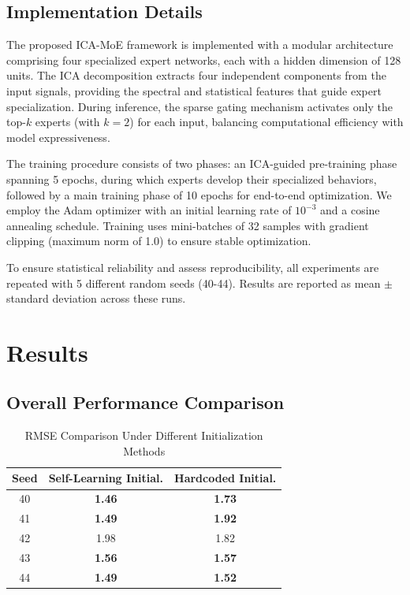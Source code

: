 \documentclass{article}
\begin{document}
\subsection{Implementation Details}

The proposed ICA-MoE framework is implemented with a modular architecture comprising four specialized expert networks, each with a hidden dimension of 128 units. The ICA decomposition extracts four independent components from the input signals, providing the spectral and statistical features that guide expert specialization. During inference, the sparse gating mechanism activates only the top-$k$ experts (with $k=2$) for each input, balancing computational efficiency with model expressiveness.

The training procedure consists of two phases: an ICA-guided pre-training phase spanning 5 epochs, during which experts develop their specialized behaviors, followed by a main training phase of 10 epochs for end-to-end optimization. We employ the Adam optimizer \cite{kingma2014adam} with an initial learning rate of $10^{-3}$ and a cosine annealing schedule. Training uses mini-batches of 32 samples with gradient clipping (maximum norm of 1.0) to ensure stable optimization.

To ensure statistical reliability and assess reproducibility, all experiments are repeated with 5 different random seeds (40-44). Results are reported as mean $\pm$ standard deviation across these runs.

\section{Results}
\label{sec:results}

\subsection{Overall Performance Comparison}

\begin{table}[!t]
\centering
\caption{RMSE Comparison Under Different Initialization Methods}
\label{tab:rmse_init}
\begin{tabular}{ccc}
\toprule
\textbf{Seed} & \textbf{Self-Learning Initial.} & \textbf{Hardcoded Initial.} \\
\midrule
40 & \textbf{1.46} & \textbf{1.73} \\
41 & \textbf{1.49} & \textbf{1.92} \\
42 & 1.98 & 1.82 \\
43 & \textbf{1.56} & \textbf{1.57} \\
44 & \textbf{1.49} & \textbf{1.52} \\
\bottomrule
\end{tabular}
\end{table}
\end{document}
